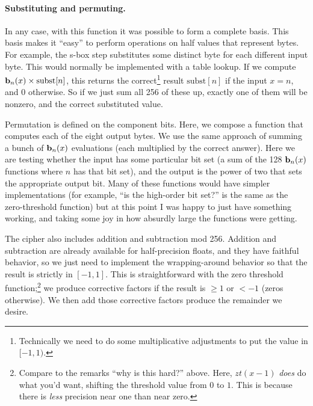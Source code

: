 \documentclass[twocolumn]{article}
\newcommand\basis{\ensuremath{\textrm{\bf b}}}
\begin{document}
\paragraph{Substituting and permuting.}
In any case, with this function it was possible to form a complete basis. This basis
makes it ``easy'' to perform operations on half values that represent bytes. For
example, the s-box step substitutes some distinct byte for each different input
byte. This would normally be implemented with a table lookup. If we compute
$\basis_n(x) \times \mathrm{subst}[n]$, this returns the correct\footnote{Technically
  we need to do some multiplicative adjustments to put the value in $[-1, 1)$.}
result $\mathrm{subst}[n]$ if the input $x = n$, and $0$ otherwise.
So if we just sum all 256 of these up, exactly one of them will be nonzero,
and the correct substituted value.

Permutation is defined on the component bits. Here, we compose a function that
computes each of the eight output bytes. We use the same approach of summing
a bunch of $\basis_n(x)$ evaluations (each multiplied by the correct answer).
Here we are testing whether the input has some particular bit set (a sum of the
128 $\basis_n(x)$ functions where $n$ has that bit set), and the output is the
power of two that sets the appropriate output bit. Many of these functions would
have simpler implementations (for example, ``is the high-order bit set?'' is the
same as the zero-threshold function) but at this point I was happy to just have
something working, and taking some joy in how absurdly large the functions
were getting.

\label{sec:cryptmodularaddition}
The cipher also includes addition and subtraction mod 256. Addition
and subtraction are already available for half-precision floats, and
they have faithful behavior, so we just need to implement the wrapping-around
behavior so that the result is strictly in $[-1, 1]$.
This is straightforward with the zero threshold function;\footnote{Compare to
  the remarks ``why is this hard?'' above. Here, $zt(x - 1)$ {\em does} do what you'd want,
  shifting the threshold value from $0$ to $1$. This is because there is {\em less}
  precision near one than near zero.}
we produce corrective factors if the result is $\geq 1$ or $< -1$ (zeros otherwise).
We then add those corrective factors produce the remainder we desire.
\end{document}
